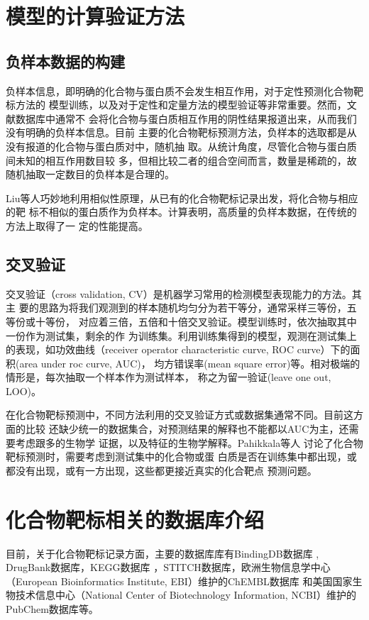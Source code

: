 \section{模型的计算验证方法}
\subsection{负样本数据的构建}
负样本信息，即明确的化合物与蛋白质不会发生相互作用，对于定性预测化合物靶标方法的
模型训练，以及对于定性和定量方法的模型验证等非常重要。然而，文献数据库中通常不
会将化合物与蛋白质相互作用的阴性结果报道出来，从而我们没有明确的负样本信息。目前
主要的化合物靶标预测方法，负样本的选取都是从没有报道的化合物与蛋白质对中，随机抽
取\cite{ding2014similarity}。从统计角度，尽管化合物与蛋白质间未知的相互作用数目较
多，但相比较二者的组合空间而言，数量是稀疏的，故随机抽取一定数目的负样本是合理的。

Liu等人\cite{liu2015improving}巧妙地利用相似性原理，从已有的化合物靶标记录出发，将化合物与相应的靶
标不相似的蛋白质作为负样本。计算表明，高质量的负样本数据，在传统的方法上取得了一
定的性能提高。
\subsection{交叉验证}
交叉验证（cross validation, CV）是机器学习常用的检测模型表现能力的方法\cite{friedman2001elements}。其主
要的思路为将我们观测到的样本随机均匀分为若干等分，通常采样三等份，五等份或十等份，
对应着三倍，五倍和十倍交叉验证。模型训练时，依次抽取其中一份作为测试集，剩余的作
为训练集。利用训练集得到的模型，观测在测试集上的表现，如功效曲线（receiver
operator characteristic curve, ROC curve）下的面积(area under roc curve, AUC)，
均方错误率(mean square error)等。相对极端的情形是，每次抽取一个样本作为测试样本，
称之为留一验证(leave one out, LOO)。

在化合物靶标预测中，不同方法利用的交叉验证方式或数据集通常不同。目前这方面的比较
还缺少统一的数据集合，对预测结果的解释也不能都以AUC为主，还需要考虑跟多的生物学
证据，以及特征的生物学解释\cite{liu2015improving}。Pahikkala等人
\cite{pahikkala2014toward}讨论了化合物靶标预测时，需要考虑到测试集中的化合物或蛋
白质是否在训练集中都出现，或都没有出现，或有一方出现，这些都更接近真实的化合靶点
预测问题。
\section{化合物靶标相关的数据库介绍}
目前，关于化合物靶标记录方面，主要的数据库库有BindingDB数据库
\cite{liu2007bindingdb}, DrugBank数据库\cite{wishart2008drugbank}，KEGG数据库
\cite{kanehisa2000kegg}，STITCH数据库\cite{kuhn2008stitch}，欧洲生物信息学中心
（European Bioinformatics Institute, EBI）维护的ChEMBL数据库
\cite{bento2014chembl}和美国国家生物技术信息中心（National Center of
Biotechnology Information, NCBI）维护的PubChem数据库\cite{wang2009pubchem}等。

